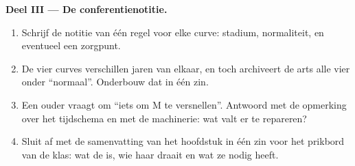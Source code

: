 \begin{problem}
\medskip\noindent\textbf{Deel III --- De conferentienotitie.}
\begin{enumerate}[resume]
  \item Schrijf de notitie van één regel voor elke curve: stadium,
        normaliteit, en eventueel een zorgpunt.
  \item De vier curves verschillen jaren van elkaar, en toch archiveert de
        arts alle vier onder ``normaal''. Onderbouw dat in één zin.
  \item Een ouder vraagt om ``iets om M te versnellen''. Antwoord met de
        opmerking over het tijdschema en met de machinerie: wat valt er te
        repareren?
  \item Sluit af met de samenvatting van het hoofdstuk in één zin voor het
        prikbord van de klas: wat de  is, wie haar draait en wat
        ze nodig heeft.
\end{enumerate}
\end{problem}
